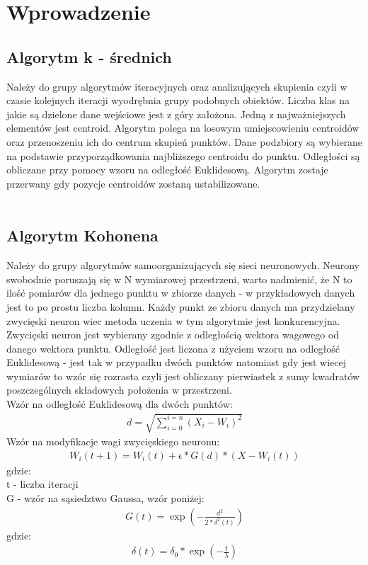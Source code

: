 \documentclass{classrep}
\begin{document}
\section{Wprowadzenie}
{
\subsection{Algorytm k - średnich }
{
Należy do grupy algorytmów iteracyjnych oraz analizujących skupienia czyli w czasie kolejnych iteracji wyodrębnia grupy
podobnych obiektów. Liczba klas na jakie są dzielone dane wejściowe jest z góry założona. Jedną z najważniejszych
elementów jest centroid. Algorytm polega na losowym umiejscowieniu centroidów oraz przenoszeniu ich do centrum
skupień punktów. Dane podzbiory są wybierane na podstawie przyporządkowania najbliższego centroidu do punktu.
Odległości są obliczane przy pomocy wzoru na odległość Euklidesową. Algorytm zostaje przerwany gdy pozycje
centroidów zostaną ustabilizowane.\\\\
}

\subsection{Algorytm Kohonena}
{
Należy do grupy algorytmów samoorganizujących się sieci neuronowych. Neurony swobodnie poruszają się w N wymiarowej
przestrzeni, warto nadmienić, że N to ilość pomiarów dla jednego punktu w zbiorze danych - w przykładowych danych
jest to po prostu liczba kolumn. Każdy punkt ze zbioru danych ma przydzielany zwycięski neuron wiec metoda uczenia
w tym algorytmie jest konkurencyjna. Zwycięski neuron jest wybierany zgodnie z odległością wektora wagowego od danego
wektora punktu. Odległość jest liczona z użyciem wzoru na odległość Euklidesową - jest tak w przypadku dwóch punktów
natomiast gdy jest wiecej wymiarów to wzór się rozrasta czyli jest obliczany pierwiastek z sumy kwadratów
poszczególnych składowych położenia w przestrzeni. \\

Wzór na odległość Euklidesową dla dwóch punktów:
\begin{align*}
d=\displaystyle\sqrt{\sum_{i=0}^{i=n} {(X_i - W_i)^2}}
\end{align*}
Wzór na modyfikacje wagi zwycięskiego neuronu:
\begin{align*}
W_i(t + 1) = W_i(t) + \epsilon * G(d)* (X - W_i(t))
\end{align*}
gdzie:\\
t - liczba iteracji\\
G - wzór na sąsiedztwo Gaussa, wzór poniżej:
\begin{align*}
G(t) = \exp (-\frac{d^2} {2* \delta^2(t)})
\end{align*}
gdzie:
\begin{align*}
\delta(t) = \delta_0 * \exp (-\frac {t} { \lambda })
\end{align*}
}


}
\end{document}
